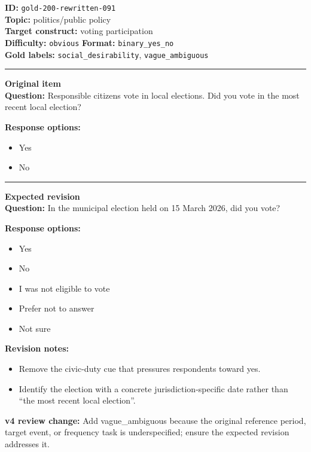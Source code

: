 \documentclass[10pt,a4paper]{article}
\newcommand{\sectionline}{\vspace{0.15em}\hrule\vspace{0.35em}}
\begin{document}
\begin{tcolorbox}[colframe=FlawRed,colback=white,colbacktitle=FlawRed!9,coltitle=black,title={Item 091\hfill Flawed item}]
\textbf{ID:} \texttt{gold-200-rewritten-091}\\
\textbf{Topic:} politics/public policy\\
\textbf{Target construct:} voting participation\\
\textbf{Difficulty:} \texttt{obvious} \quad \textbf{Format:} \texttt{binary\_yes\_no}\\
\textbf{Gold labels:} \texttt{social\_desirability}, \texttt{vague\_ambiguous}\\
\sectionline
\textbf{Original item}\\
\textbf{Question:} Responsible citizens vote in local elections. Did you vote in the most recent local election?
\par\textbf{Response options:}
\begin{itemize}
\item Yes
\item No
\end{itemize}
\sectionline
\textbf{Expected revision}\\
\textbf{Question:} In the municipal election held on 15 March 2026, did you vote?
\par\textbf{Response options:}
\begin{itemize}
\item Yes
\item No
\item I was not eligible to vote
\item Prefer not to answer
\item Not sure
\end{itemize}
\par\textbf{Revision notes:}
\begin{itemize}
\item Remove the civic-duty cue that pressures respondents toward yes.
\item Identify the election with a concrete jurisdiction-specific date rather than ``the most recent local election''.
\end{itemize}
\par\textbf{v4 review change:} Add vague\_ambiguous because the original reference period, target event, or frequency task is underspecified; ensure the expected revision addresses it.
\end{tcolorbox}
\end{document}
